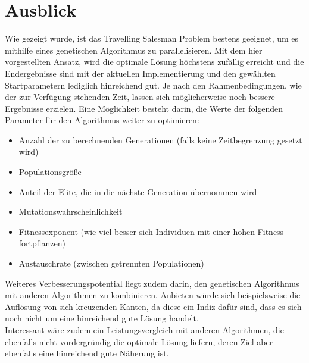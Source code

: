 \documentclass[12pt,a4paper]{scrreprt}
\begin{document}
\chapter{Ausblick}
\label{chap:ausblick}

Wie gezeigt wurde, ist das Travelling Salesman Problem bestens geeignet, um es mithilfe eines genetischen Algorithmus zu parallelisieren. Mit dem hier vorgestellten Ansatz, wird die optimale Lösung höchstens zufällig erreicht und die Endergebnisse sind mit der aktuellen Implementierung und den gewählten Startparametern lediglich hinreichend gut. Je nach den Rahmenbedingungen, wie der zur Verfügung stehenden Zeit, lassen sich möglicherweise noch bessere Ergebnisse erzielen. Eine Möglichkeit besteht darin, die Werte der folgenden Parameter für den Algorithmus weiter zu optimieren:

\begin{itemize}
\item Anzahl der zu berechnenden Generationen (falls keine Zeitbegrenzung gesetzt wird)
\item Populationsgröße
\item Anteil der Elite, die in die nächste Generation übernommen wird
\item Mutationswahrscheinlichkeit
\item Fitnessexponent (wie viel besser sich Individuen mit einer hohen Fitness fortpflanzen)
\item Austauschrate (zwischen getrennten Populationen)
\end{itemize}

Weiteres Verbesserungspotential liegt zudem darin, den genetischen Algorithmus mit anderen Algorithmen zu kombinieren. Anbieten würde sich beispielsweise die Auflösung von sich kreuzenden Kanten, da diese ein Indiz dafür sind, dass es sich noch nicht um eine hinreichend gute Lösung handelt.\\
Interessant wäre zudem ein Leistungsvergleich mit anderen Algorithmen, die ebenfalls nicht vordergründig die optimale Lösung liefern, deren Ziel aber ebenfalls eine hinreichend gute Näherung ist.

\clearpage
{}
\lstlistoflistings
{}
\listoffigures
\listoftables


\end{document}
